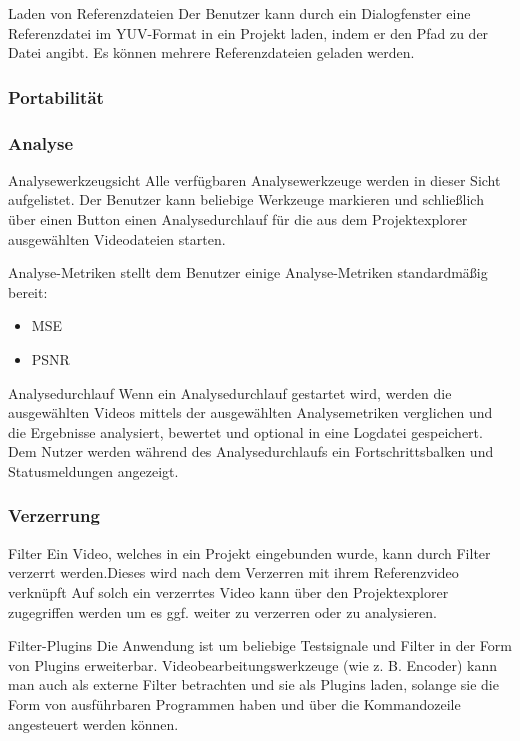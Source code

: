  Laden von Referenzdateien
\newline
Der Benutzer kann durch ein Dialogfenster eine Referenzdatei im YUV-Format in ein Projekt laden, indem er
 den Pfad zu der Datei angibt. Es können mehrere Referenzdateien geladen werden.

\subsubsection{Portabilität}

\subsubsection{Analyse}

 Analysewerkzeugsicht
\newline
Alle verfügbaren Analysewerkzeuge werden in dieser Sicht aufgelistet. Der Benutzer kann beliebige Werkzeuge
 markieren und schließlich über einen Button einen Analysedurchlauf für die aus dem Projektexplorer
  ausgewählten Videodateien starten.


 Analyse-Metriken
\newline
\projektTitel stellt dem Benutzer einige Analyse-Metriken standardmäßig bereit:
\begin{itemize}
\item \gls{MSE}
\item \gls{PSNR}
\end{itemize}


 Analysedurchlauf
\newline
Wenn ein Analysedurchlauf gestartet wird, werden die ausgewählten Videos mittels der ausgewählten
 Analysemetriken verglichen und die Ergebnisse analysiert, bewertet und optional in eine Logdatei
  gespeichert. Dem Nutzer werden während des Analysedurchlaufs ein Fortschrittsbalken und Statusmeldungen
   angezeigt. 

\subsubsection{Verzerrung}
 Filter
\newline
Ein Video, welches in ein Projekt eingebunden wurde, kann durch Filter verzerrt werden.Dieses wird
nach dem Verzerren mit ihrem Referenzvideo verknüpft  Auf solch ein verzerrtes Video kann über den Projektexplorer zugegriffen werden um es ggf. weiter zu verzerren oder zu analysieren.


 Filter-Plugins
\newline
Die Anwendung ist um beliebige Testsignale und Filter in der Form von Plugins erweiterbar.
 Videobearbeitungswerkzeuge (wie z. B. Encoder) kann man auch als externe Filter betrachten und sie als
  Plugins laden, solange sie die Form von ausführbaren Programmen haben und über die Kommandozeile 
angesteuert werden können.

